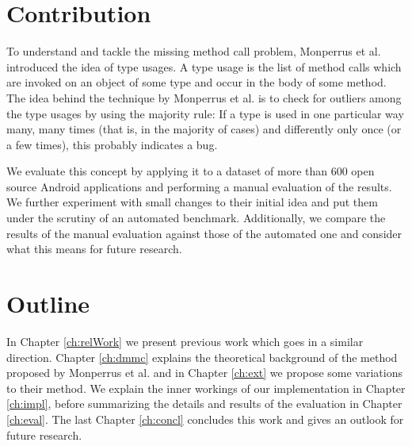 
\section{Contribution}

To understand and tackle the missing method call problem, Monperrus et al. \cite{monperrus2010detecting}\cite{monperrus2013detecting} introduced the idea of type usages.
A type usage is the list of method calls which are invoked on an object of some type and occur in the body of some method.
The idea behind the technique by Monperrus et al. is to check for outliers among the type usages by using the majority rule:
If a type is used in one particular way many, many times (that is, in the majority of cases) and differently only once (or a few times), this probably indicates a bug.

We evaluate this concept by applying it to a dataset of more than 600 open source Android applications and performing a manual evaluation of the results.
We further experiment with small changes to their initial idea and put them under the scrutiny of an automated benchmark.
Additionally, we compare the results of the manual evaluation against those of the automated one and consider what this means for future research.

\section{Outline}

In Chapter \ref{ch:relWork} we present previous work which goes in a similar direction.
Chapter \ref{ch:dmmc} explains the theoretical background of the method proposed by Monperrus et al. and in Chapter \ref{ch:ext} we propose some variations to their method.
We explain the inner workings of our implementation in Chapter \ref{ch:impl}, before summarizing the details and results of the evaluation in Chapter \ref{ch:eval}.
The last Chapter \ref{ch:concl} concludes this work and gives an outlook for future research.

